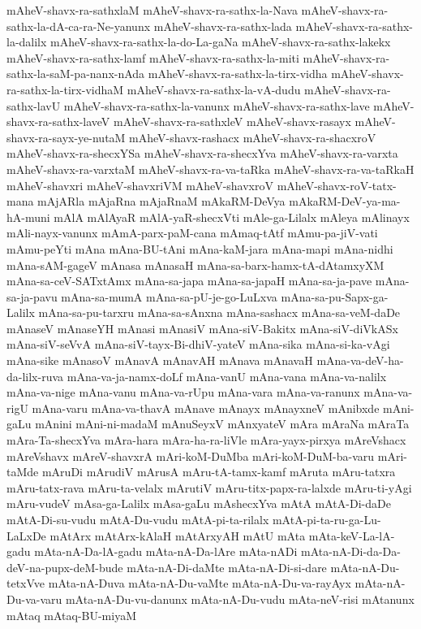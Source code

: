 {mAheV-shavx-ra-sathxlaM
mAheV-shavx-ra-sathx-la-Nava
mAheV-shavx-ra-sathx-la-dA-ca-ra-Ne-yanunx
mAheV-shavx-ra-sathx-lada
mAheV-shavx-ra-sathx-la-dalilx
mAheV-shavx-ra-sathx-la-do-La-gaNa
mAheV-shavx-ra-sathx-lakekx
mAheV-shavx-ra-sathx-lamf
mAheV-shavx-ra-sathx-la-miti
mAheV-shavx-ra-sathx-la-saM-pa-nanx-nAda
mAheV-shavx-ra-sathx-la-tirx-vidha
mAheV-shavx-ra-sathx-la-tirx-vidhaM
mAheV-shavx-ra-sathx-la-vA-dudu
mAheV-shavx-ra-sathx-lavU
mAheV-shavx-ra-sathx-la-vanunx
mAheV-shavx-ra-sathx-lave
mAheV-shavx-ra-sathx-laveV
mAheV-shavx-ra-sathxleV
mAheV-shavx-rasayx
mAheV-shavx-ra-sayx-ye-nutaM
mAheV-shavx-rashacx
mAheV-shavx-ra-shacxroV
mAheV-shavx-ra-shecxYSa
mAheV-shavx-ra-shecxYva
mAheV-shavx-ra-varxta
mAheV-shavx-ra-varxtaM
mAheV-shavx-ra-va-taRka
mAheV-shavx-ra-va-taRkaH
mAheV-shavxri
mAheV-shavxriVM
mAheV-shavxroV
mAheV-shavx-roV-tatx-mana
mAjARla
mAjaRna
mAjaRnaM
mAkaRM-DeVya
mAkaRM-DeV-ya-ma-hA-muni
mAlA
mAlAyaR
mAlA-yaR-shecxVti
mAle-ga-Lilalx
mAleya
mAlinayx
mAli-nayx-vanunx
mAmA-parx-paM-cana
mAmaq-tAtf
mAmu-pa-jiV-vati
mAmu-peYti
mAna
mAna-BU-tAni
mAna-kaM-jara
mAna-mapi
mAna-nidhi
mAna-sAM-gageV
mAnasa
mAnasaH
mAna-sa-barx-hamx-tA-dAtamxyXM
mAna-sa-ceV-SATxtAmx
mAna-sa-japa
mAna-sa-japaH
mAna-sa-ja-pave
mAna-sa-ja-pavu
mAna-sa-mumA
mAna-sa-pU-je-go-LuLxva
mAna-sa-pu-Sapx-ga-Lalilx
mAna-sa-pu-tarxru
mAna-sa-sAnxna
mAna-sashacx
mAna-sa-veM-daDe
mAnaseV
mAnaseYH
mAnasi
mAnasiV
mAna-siV-Bakitx
mAna-siV-diVkASx
mAna-siV-seVvA
mAna-siV-tayx-Bi-dhiV-yateV
mAna-sika
mAna-si-ka-vAgi
mAna-sike
mAnasoV
mAnavA
mAnavAH
mAnava
mAnavaH
mAna-va-deV-ha-da-lilx-ruva
mAna-va-ja-namx-doLf
mAna-vanU
mAna-vana
mAna-va-nalilx
mAna-va-nige
mAna-vanu
mAna-va-rUpu
mAna-vara
mAna-va-ranunx
mAna-va-rigU
mAna-varu
mAna-va-thavA
mAnave
mAnayx
mAnayxneV
mAnibxde
mAni-gaLu
mAnini
mAni-ni-madaM
mAnuSeyxV
mAnxyateV
mAra
mAraNa
mAraTa
mAra-Ta-shecxYva
mAra-hara
mAra-ha-ra-liVle
mAra-yayx-pirxya
mAreVshacx
mAreVshavx
mAreV-shavxrA
mAri-koM-DuMba
mAri-koM-DuM-ba-varu
mAri-taMde
mAruDi
mArudiV
mArusA
mAru-tA-tamx-kamf
mAruta
mAru-tatxra
mAru-tatx-rava
mAru-ta-velalx
mArutiV
mAru-titx-papx-ra-lalxde
mAru-ti-yAgi
mAru-vudeV
mAsa-ga-Lalilx
mAsa-gaLu
mAshecxYva
mAtA
mAtA-Di-daDe
mAtA-Di-su-vudu
mAtA-Du-vudu
mAtA-pi-ta-rilalx
mAtA-pi-ta-ru-ga-Lu-LaLxDe
mAtArx
mAtArx-kAlaH
mAtArxyAH
mAtU
mAta
mAta-keV-La-lA-gadu
mAta-nA-Da-lA-gadu
mAta-nA-Da-lAre
mAta-nADi
mAta-nA-Di-da-Da-deV-na-pupx-deM-bude
mAta-nA-Di-daMte
mAta-nA-Di-si-dare
mAta-nA-Du-tetxVve
mAta-nA-Duva
mAta-nA-Du-vaMte
mAta-nA-Du-va-rayAyx
mAta-nA-Du-va-varu
mAta-nA-Du-vu-danunx
mAta-nA-Du-vudu
mAta-neV-risi
mAtanunx
mAtaq
mAtaq-BU-miyaM
}
